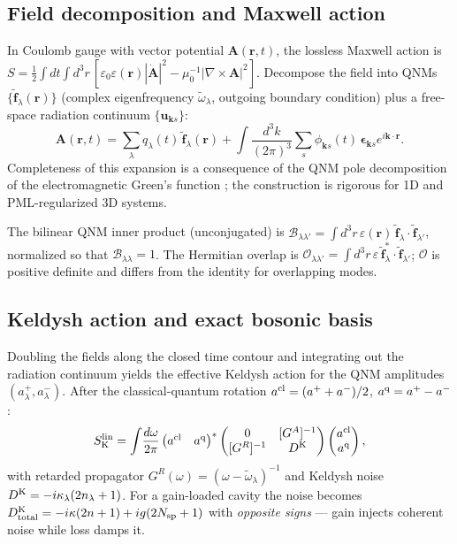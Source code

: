 \documentclass[11pt]{article}
\newcommand{\cl}{{\rm cl}}
\newcommand{\q}{{\rm q}}
\newcommand{\K}{{\rm K}}
\newcommand{\tf}{\tilde{\mathbf{f}}}
\newcommand{\tomega}{\tilde{\omega}}
\newcommand{\calO}{\mathcal{O}}
\begin{document}
\subsection{Field decomposition and Maxwell action}

In Coulomb gauge with vector potential $\mathbf{A}(\mathbf{r},t)$, the
lossless Maxwell action is
\(S=\tfrac{1}{2}\int dt\int d^3r\,[\varepsilon_0\varepsilon(\mathbf{r})
|\dot{\mathbf{A}}|^2-\mu_0^{-1}|\nabla\times\mathbf{A}|^2]\).
Decompose the field into QNMs $\{\tf_\lambda(\mathbf{r})\}$ (complex
eigenfrequency $\tomega_\lambda$, outgoing boundary condition) plus a
free-space radiation continuum $\{\mathbf{u}_{\mathbf{k}s}\}$:
\begin{equation}
  \mathbf{A}(\mathbf{r},t) = \sum_\lambda q_\lambda(t)\,\tf_\lambda(\mathbf{r})
  + \int\!\frac{d^3k}{(2\pi)^3}\sum_s \phi_{\mathbf{k}s}(t)\,
    \boldsymbol{\epsilon}_{\mathbf{k}s}e^{i\mathbf{k}\cdot\mathbf{r}}.
  \label{eq:decomp}
\end{equation}
Completeness of this expansion is a consequence of the QNM pole
decomposition of the electromagnetic Green's function
\cite{Sauvan2013,Leung1994}; the construction is rigorous for 1D and
PML-regularized 3D systems.

The bilinear QNM inner product (unconjugated) is
$\mathcal{B}_{\lambda\lambda'}=\int d^3r\,\varepsilon(\mathbf{r})\,
\tf_\lambda\cdot\tf_{\lambda'}$, normalized so that
$\mathcal{B}_{\lambda\lambda}=1$.  The Hermitian overlap is
$\calO_{\lambda\lambda'}=\int d^3r\,\varepsilon\,\tf_\lambda^*\cdot\tf_{\lambda'}$;
$\calO$ is positive definite and differs from the identity for
overlapping modes.

\subsection{Keldysh action and exact bosonic basis}
\label{sec:nonortho}

Doubling the fields along the closed time contour and integrating out
the radiation continuum yields the effective Keldysh action for the QNM
amplitudes $(a^+_\lambda, a^-_\lambda)$.  After the
classical-quantum rotation $a^\cl=(a^++a^-)/2$, $a^\q=a^+-a^-$:
\begin{equation}
  S_\K^{\rm lin} = \int\!\frac{d\omega}{2\pi}
  \begin{pmatrix}a^\cl & a^\q\end{pmatrix}^*
  \begin{pmatrix}0 & [G^A]^{-1}\\ [G^R]^{-1} & D^\K\end{pmatrix}
  \begin{pmatrix}a^\cl\\ a^\q\end{pmatrix},
  \label{eq:Keldysh_matrix}
\end{equation}
with retarded propagator $G^R(\omega)=(\omega-\tomega_\lambda)^{-1}$ and
Keldysh noise $D^\K=-i\kappa_\lambda(2n_\lambda+1)$.  For a gain-loaded
cavity the noise becomes $D^\K_{\rm total}=-i\kappa(2n+1)+ig(2N_{\rm sp}+1)$
with \emph{opposite signs} --- gain injects coherent noise while loss
damps it.
\end{document}
